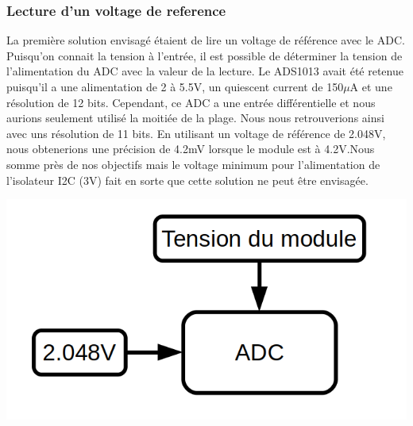\documentclass[12pt,letterpaper]{article}
\begin{document}
\begin{normalsize}
				\subsubsection{Lecture d'un voltage de reference}
					La premi\`{e}re solution envisag\'{e} \'{e}taient de lire un voltage de r\'{e}f\'{e}rence avec le ADC. Puisqu'on connait la tension \`{a} l'entr\'{e}e, il est possible de d\'{e}terminer la tension de l'alimentation du ADC avec la valeur de la lecture. Le ADS1013 avait \'{e}t\'{e} retenue puisqu'il a une alimentation de 2 \`{a} 5.5V, un quiescent current de 150$\mu$A et une r\'{e}solution de 12 bits. Cependant, ce ADC a une entr\'{e}e diff\'{e}rentielle et nous aurions seulement utilis\'{e} la moiti\'{e}e de la plage. Nous nous retrouverions ainsi avec uns r\'{e}solution de 11 bits. En utilisant un voltage de r\'{e}f\'{e}rence de 2.048V, nous obtenerions une pr\'{e}cision de 4.2mV lorsque le module est \`{a} 4.2V.Nous somme pr\`{e}s de nos objectifs mais le voltage minimum pour l'alimentation de l'isolateur I2C (3V) fait en sorte que cette solution ne peut \^{e}tre envisag\'{e}e.
					\begin{center}
						\includegraphics[scale=0.3]{Voltage_reference} \\ \vspace{1cm}
					\end{center}
				\newpage

\end{normalsize}
\end{document}
